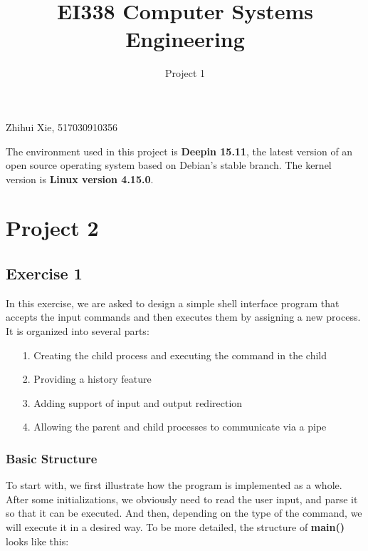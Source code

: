\documentclass{article}
\title{EI338 Computer Systems Engineering}
\author{Project 1}
\begin{document}
\maketitle

\begin{center}
    Zhihui Xie, 517030910356
\end{center}

The environment used in this project is \textbf{Deepin 15.11}, the latest version of an open source operating system based on Debian's stable branch. The kernel version is \textbf{Linux version 4.15.0}.

\section*{Project 2}
\subsection*{Exercise 1}
In this exercise, we are asked to design a simple shell interface program that accepts the input commands and then executes them by assigning a new process. It is organized into several parts:

\begin{itemize}
    \item[1.] Creating the child process and executing the command in the child
    \item[2.] Providing a history feature
    \item[3.] Adding support of input and output redirection
    \item[4.] Allowing the parent and child processes to communicate via a pipe
\end{itemize}

\subsubsection*{Basic Structure}
To start with, we first illustrate how the program is implemented as a whole. After some initializations, we obviously need to read the user input, and parse it so that it can be executed. And then, depending on the type of the command, we will execute it in a desired way. To be more detailed, the structure of \textbf{main()} looks like this:
\end{document}
